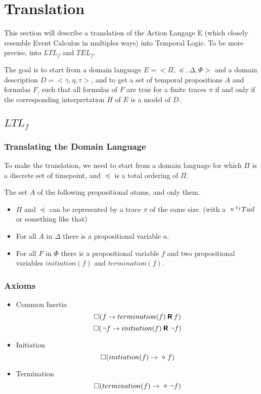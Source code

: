 \section{Translation}\label{sec:translation}

This section will describe a translation of the Action Langage E (which closely resemble Event Calculus in multiples ways) into Temporal Logic.
To be more precise, into $LTL_f$ and $TEL_f$.

The goal is to start from a domain language $E=<\Pi,\preceq,\Delta,\Phi>$ and a domain description $D=<\gamma,\eta,\tau>$, and to get a set of temporal propositions $A$ and formulas $F$, such that all formulas of $F$ are true for a finite traces $\pi$ if and only if the corresponding interpretation $H$ of $E$ is a model of $D$.

\subsection{$LTL_f$}

\subsubsection{Translating the Domain Language}

To make the translation, we need to start from a domain language for which $\Pi$ is a discrete set of timepoint, and $\preceq$ is a total ordering of $\Pi$.

The set $A$ of the following propositional atoms, and only them.

\begin{itemize}
  \item $\Pi$ and $\preceq$ can be represented by a trace $\pi$ of the same size. (with a $\next^{t_f}Tail$ or something like that)
  \item For all $A$ in $\Delta$ there is a propositional variable $a$.
  \item For all $F$ in $\Phi$ there is a propositional variable $f$ and two propositional variables $initiation(f)$ and $termination(f)$.
\end{itemize}

\subsubsection{Axioms}

\begin{itemize}
  \item Common Inertia
  $$\square(f\rightarrow termination(f) \mathbin{\bm{\mathsf{R}}} f)$$
  $$\square(\neg f\rightarrow initiation(f) \mathbin{\bm{\mathsf{R}}} \neg f)$$
  \item Initiation $$\alwaysF(initiation(f)\rightarrow\next f)$$
  \item Termination $$\alwaysF(termination(f)\rightarrow\next \neg f)$$
\end{itemize}

